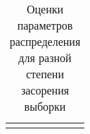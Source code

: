 \documentclass[12pt%
                    ]{report}
\begin{document}
\begin{longtable}[c]{%
	b{\gnumericColA}%
	b{\gnumericColB}%
	b{\gnumericColC}%
	b{\gnumericColD}%
	b{\gnumericColE}%
	b{\gnumericColF}%
	b{\gnumericColG}%
	}

\captionsetup{justification=raggedleft,singlelinecheck=false}
\caption{Оценки параметров распределения для разной степени засорения выборки }             %
\label{table:rawest} \\






\end{longtable}
\end{document}
